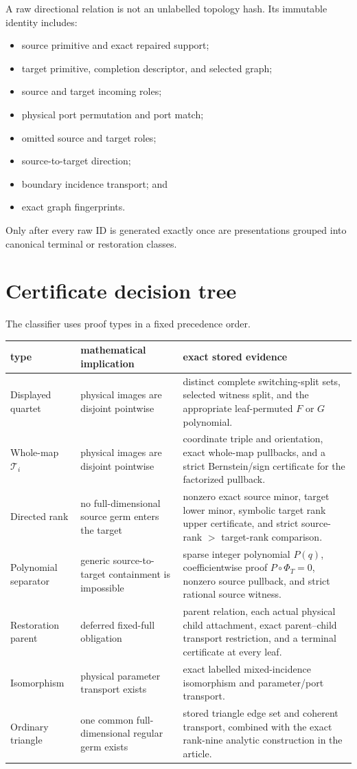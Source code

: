 \documentclass[11pt]{article}
\theoremstyle{remark}
\newcommand{\Ti}{\mathcal T_i}
\begin{document}
A raw directional relation is not an unlabelled topology hash.  Its immutable
identity includes:
\begin{itemize}
  \item source primitive and exact repaired support;
  \item target primitive, completion descriptor, and selected graph;
  \item source and target incoming roles;
  \item physical port permutation and port match;
  \item omitted source and target roles;
  \item source-to-target direction;
  \item boundary incidence transport; and
  \item exact graph fingerprints.
\end{itemize}
Only after every raw ID is generated exactly once are presentations grouped
into canonical terminal or restoration classes.

\section{Certificate decision tree}\label{sec:certificates}

The classifier uses proof types in a fixed precedence order.

\begin{longtable}{L{.19\linewidth}L{.33\linewidth}L{.39\linewidth}}
\toprule
type & mathematical implication & exact stored evidence\\
\midrule
\endhead
Displayed quartet
& physical images are disjoint pointwise
& distinct complete switching-split sets, selected witness split, and the
appropriate leaf-permuted \(F\) or \(G\) polynomial.\\
Whole-map \(\Ti\)
& physical images are disjoint pointwise
& coordinate triple and orientation, exact whole-map pullbacks, and a
strict Bernstein/sign certificate for the factorized pullback.\\
Directed rank
& no full-dimensional source germ enters the target
& nonzero exact source minor, target lower minor, symbolic target rank upper
certificate, and strict source-rank \(>\) target-rank comparison.\\
Polynomial separator
& generic source-to-target containment is impossible
& sparse integer polynomial \(P(q)\), coefficientwise proof
\(P\circ\Phi_T=0\), nonzero source pullback, and strict rational source
witness.\\
Restoration parent
& deferred fixed-full obligation
& parent relation, each actual physical child attachment, exact parent--child
transport restriction, and a terminal certificate at every leaf.\\
Isomorphism
& physical parameter transport exists
& exact labelled mixed-incidence isomorphism and parameter/port transport.\\
Ordinary triangle
& one common full-dimensional regular germ exists
& stored triangle edge set and coherent transport, combined with the exact
rank-nine analytic construction in the article.\\
\bottomrule
\end{longtable}
\end{document}
